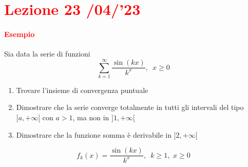\documentclass{article}
\begin{document}
\newpage
\section{\textcolor{red}{Lezione 23 \space{}/04/'23}}
\paragraph{\textcolor{red}{Esempio}}
Sia data la serie di funzioni
\begin{equation*}
    \sum_{k=1}^{\infty}\frac{\sin(kx)}{k^x},\,\,\, x \geq 0
\end{equation*}
\begin{enumerate}
    \item Trovare l'insieme di convergenza puntuale
    \item Dimostrare che la serie converge totalmente in tutti gli intervali del tipo $[a,+\infty[$ con $a > 1$, ma non in $]1,+\infty[$
    \item Dimostrare che la funzione somma è derivabile in $]2,+\infty[$
\end{enumerate}
\begin{equation*}
    f_k(x)=\frac{\sin(kx)}{k^x},\,\,\, k \geq 1, \,\, x \geq 0
\end{equation*}
\end{document}
